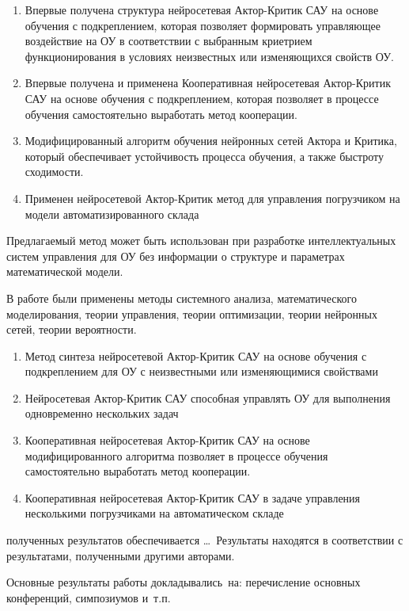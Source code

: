 {\novelty}
\begin{enumerate}
  \item Впервые получена структура нейросетевая Актор-Критик САУ на основе обучения с подкреплением, которая позволяет формировать управляющее воздействие на ОУ в соответствии с выбранным криетрием функционирования в условиях неизвестных или изменяющихся свойств ОУ.
  \item Впервые получена и применена Кооперативная нейросетевая Актор-Критик САУ на основе обучения с подкреплением, которая позволяет в процессе обучения самостоятельно выработать метод кооперации.
  \item Модифицированный алгоритм обучения нейронных сетей Актора и Критика, который обеспечивает устойчивость процесса обучения, а также быстроту сходимости.
  \item Применен нейросетевой Актор-Критик метод для управления погрузчиком на модели автоматизированного склада
\end{enumerate}

{\influence} Предлагаемый метод может быть использован при разработке интеллектуальных систем управления для ОУ без информации о структуре и параметрах математической модели.

{\methods} В работе были применены методы системного анализа, математического моделирования, теории управления, теории оптимизации, теории нейронных сетей, теории вероятности.

{}
\begin{enumerate}
	\item Метод синтеза нейросетевой Актор-Критик САУ на основе обучения с подкреплением для ОУ с неизвестными или изменяющимися свойствами
	\item Нейросетевая Актор-Критик САУ способная управлять ОУ для выполнения одновременно нескольких задач
	\item Кооперативная нейросетевая Актор-Критик САУ на основе модифицированного алгоритма позволяет в процессе обучения самостоятельно выработать метод кооперации.
	\item Кооперативная нейросетевая Актор-Критик САУ в задаче управления несколькими погрузчиками на автоматическом складе
\end{enumerate}

{\reliability} полученных результатов обеспечивается \ldots \ Результаты находятся в соответствии с результатами, полученными другими авторами.


{\probation}
Основные результаты работы докладывались~на:
перечисление основных конференций, симпозиумов и~т.\:п.

